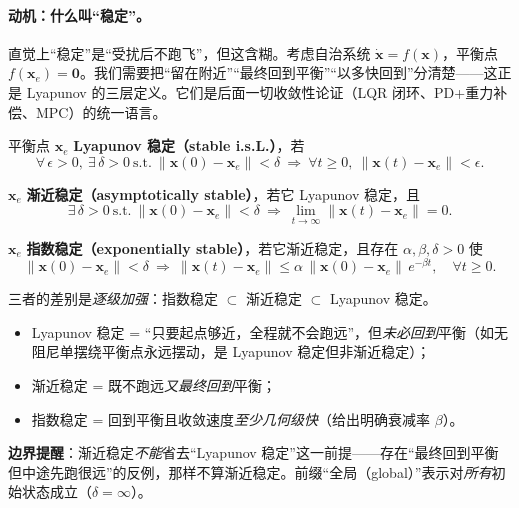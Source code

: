 \paragraph{动机：什么叫“稳定”。}
直觉上“稳定”是“受扰后不跑飞”，但这含糊。考虑自治系统 $\dot{\mathbf{x}}=f(\mathbf{x})$，平衡点 $f(\mathbf{x}_e)=\mathbf{0}$。我们需要把“留在附近”“最终回到平衡”“以多快回到”分清楚——这正是 Lyapunov 的三层定义\cite{khalil2002nonlinear}。它们是后面一切收敛性论证（LQR 闭环、PD+重力补偿、MPC）的统一语言。

\begin{definition}[Lyapunov 稳定]
\label{def:ctrl-lyap-stable}
平衡点 $\mathbf{x}_e$ \textbf{Lyapunov 稳定（stable i.s.L.）}，若
\begin{equation}
  \forall\,\epsilon>0,\ \exists\,\delta>0\ \text{s.t.}\ \|\mathbf{x}(0)-\mathbf{x}_e\|<\delta\ \Rightarrow\ \forall t\ge0,\ \|\mathbf{x}(t)-\mathbf{x}_e\|<\epsilon.
  \label{eq:ctrl-lyap-stable}
\end{equation}
\end{definition}

\begin{definition}[渐近稳定]
\label{def:ctrl-asymp-stable}
$\mathbf{x}_e$ \textbf{渐近稳定（asymptotically stable）}，若它 Lyapunov 稳定，且
\begin{equation}
  \exists\,\delta>0\ \text{s.t.}\ \|\mathbf{x}(0)-\mathbf{x}_e\|<\delta\ \Rightarrow\ \lim_{t\to\infty}\|\mathbf{x}(t)-\mathbf{x}_e\|=0.
\end{equation}
\end{definition}

\begin{definition}[指数稳定]
\label{def:ctrl-exp-stable}
$\mathbf{x}_e$ \textbf{指数稳定（exponentially stable）}，若它渐近稳定，且存在 $\alpha,\beta,\delta>0$ 使
\begin{equation}
  \|\mathbf{x}(0)-\mathbf{x}_e\|<\delta\ \Rightarrow\ \|\mathbf{x}(t)-\mathbf{x}_e\|\le\alpha\,\|\mathbf{x}(0)-\mathbf{x}_e\|\,e^{-\beta t},\quad\forall t\ge0.
\end{equation}
\end{definition}

\begin{insight}
三者的差别是\emph{逐级加强}：指数稳定 $\subset$ 渐近稳定 $\subset$ Lyapunov 稳定。
\begin{itemize}
  \item Lyapunov 稳定 = “只要起点够近，全程就不会跑远”，但\emph{未必回到}平衡（如无阻尼单摆绕平衡点永远摆动，是 Lyapunov 稳定但非渐近稳定）；
  \item 渐近稳定 = 既不跑远\emph{又最终回到}平衡；
  \item 指数稳定 = 回到平衡且收敛速度\emph{至少几何级快}（给出明确衰减率 $\beta$）。
\end{itemize}
\textbf{边界提醒}：渐近稳定\emph{不能}省去“Lyapunov 稳定”这一前提——存在“最终回到平衡但中途先跑很远”的反例，那样不算渐近稳定。前缀“全局（global）”表示对\emph{所有}初始状态成立（$\delta=\infty$）。
\end{insight}

